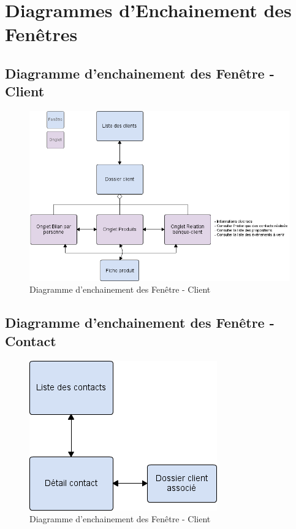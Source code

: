 \section{Diagrammes d'Enchainement des Fenêtres}

\subsection{Diagramme d'enchainement des Fenêtre - Client} 

\begin{figure}[H]
	\begin{center}
		\includegraphics[scale=0.6]{EDF/Client.png}
		\caption{Diagramme d'enchainement des Fenêtre - Client}
	\end{center}
\end{figure}

\subsection{Diagramme d'enchainement des Fenêtre - Contact} 

\begin{figure}[H]
	\begin{center}
		\includegraphics[scale=0.6]{EDF/Contact.png}
		\caption{Diagramme d'enchainement des Fenêtre - Client}
	\end{center}
\end{figure}

